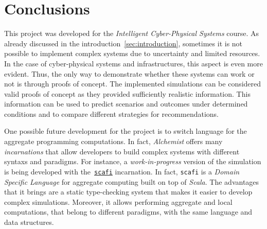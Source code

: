 \section{Conclusions}
This project was developed for the \textit{Intelligent Cyber-Physical Systems} course.
As already discussed in the introduction~\ref{sec:introduction}, sometimes it is not possible to implement complex systems due to uncertainty and limited resources.
In the case of cyber-physical systems and infrastructures, this aspect is even more evident.
Thus, the only way to demonstrate whether these systems can work or not is through proofs of concept.
The implemented simulations can be considered valid proofs of concept as they provided sufficiently realistic information.
This information can be used to predict scenarios and outcomes under determined conditions and to compare different strategies for recommendations.

One possible future development for the project is to switch language for the aggregate programming computations.
In fact, \textit{Alchemist} offers many \textit{incarnations} that allow developers to build complex systems with different syntaxs and paradigms.
For instance, a \textit{work-in-progress} version of the simulation is being developed with the~\href{https://scafi.github.io/}{\texttt{scafi}} incarnation.
In fact, \texttt{scafi} is a \textit{Domain Specific Language} for aggregate computing built on top of \textit{Scala}.
The advantages that it brings are a static type-checking system that makes it easier to develop complex simulations.
Moreover, it allows performing aggregate and local computations, that belong to different paradigms, with the same language and data structures.
